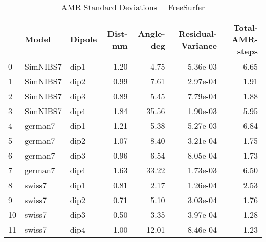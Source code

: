 \documentclass{article}
\begin{document}
\begin{table}
\begin{tabular}{lllrrrr}
\toprule
& Model& Dipole& Dist-mm& Angle-deg& Residual-Variance& Total-AMR-steps\\
\midrule
\rowcolor{lightgray}0 & SimNIBS7 & dip1 & 1.20 & 4.75 & 5.36e-03 & 6.65\\
\rowcolor{lightgray}1 & SimNIBS7 & dip2 & 0.99 & 7.61 & 2.97e-04 & 1.91\\
\rowcolor{lightgray}2 & SimNIBS7 & dip3 & 0.89 & 5.45 & 7.79e-04 & 1.88\\
\rowcolor{lightgray}3 & SimNIBS7 & dip4 & 1.84 & 35.56 & 1.90e-03 & 5.95\\
\rowcolor{yellow}4 & german7 & dip1 & 1.21 & 5.38 & 5.27e-03 & 6.84\\
\rowcolor{yellow}5 & german7 & dip2 & 1.07 & 8.40 & 3.21e-04 & 1.75\\
\rowcolor{yellow}6 & german7 & dip3 & 0.96 & 6.54 & 8.05e-04 & 1.73\\
\rowcolor{yellow}7 & german7 & dip4 & 1.63 & 33.22 & 1.73e-03 & 6.50\\
\rowcolor{pink}8 & swiss7 & dip1 & 0.81 & 2.17 & 1.26e-04 & 2.53\\
\rowcolor{pink}9 & swiss7 & dip2 & 0.71 & 5.10 & 3.03e-04 & 1.76\\
\rowcolor{pink}10 & swiss7 & dip3 & 0.50 & 3.35 & 3.97e-04 & 1.28\\
\rowcolor{pink}11 & swiss7 & dip4 & 1.00 & 12.01 & 8.46e-04 & 1.23\\
\end{tabular}
\caption{AMR Standard Deviations \ \textemdash \ FreeSurfer}
\end{table}
\end{document}
